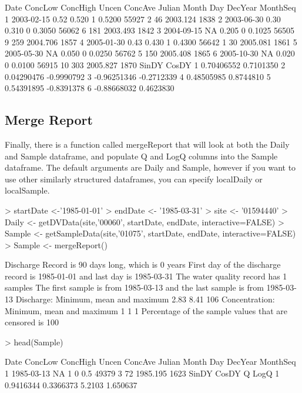 \documentclass[a4paper,11pt]{article}
\begin{document}
\begin{Schunk}
\begin{Soutput}
        Date ConcLow ConcHigh Uncen ConcAve Julian Month Day  DecYear MonthSeq
1 2003-02-15    0.52    0.520     1  0.5200  55927     2  46 2003.124     1838
2 2003-06-30    0.30    0.310     0  0.3050  56062     6 181 2003.493     1842
3 2004-09-15      NA    0.205     0  0.1025  56505     9 259 2004.706     1857
4 2005-01-30    0.43    0.430     1  0.4300  56642     1  30 2005.081     1861
5 2005-05-30      NA    0.050     0  0.0250  56762     5 150 2005.408     1865
6 2005-10-30      NA    0.020     0  0.0100  56915    10 303 2005.827     1870
        SinDY      CosDY
1  0.70406552  0.7101350
2  0.04290476 -0.9990792
3 -0.96251346 -0.2712339
4  0.48505985  0.8744810
5  0.54391895 -0.8391378
6 -0.88668032  0.4623830
\end{Soutput}
\end{Schunk}

\subsection{Merge Report}
Finally, there is a function called mergeReport that will look at both the Daily and Sample dataframe, and populate Q and LogQ columns into the Sample dataframe. The default arguments are Daily and Sample, however if you want to use other similarly structured dataframes, you can specify localDaily or localSample.

\begin{Schunk}
\begin{Sinput}
> startDate <-'1985-01-01' 
> endDate <- '1985-03-31'
> site <- '01594440'
> Daily <- getDVData(site,'00060', startDate, endDate, interactive=FALSE)
> Sample <- getSampleData(site,'01075', startDate, endDate, interactive=FALSE)
> Sample <- mergeReport()
\end{Sinput}
\begin{Soutput}
 Discharge Record is 90 days long, which is 0 years
 First day of the discharge record is 1985-01-01 and last day is 1985-03-31
 The water quality record has 1 samples
 The first sample is from 1985-03-13 and the last sample is from 1985-03-13
 Discharge: Minimum, mean and maximum 2.83 8.41 106
 Concentration: Minimum, mean and maximum 1 1 1
 Percentage of the sample values that are censored is 100 %
\end{Soutput}
\begin{Sinput}
> head(Sample)
\end{Sinput}
\begin{Soutput}
        Date ConcLow ConcHigh Uncen ConcAve Julian Month Day  DecYear MonthSeq
1 1985-03-13      NA        1     0     0.5  49379     3  72 1985.195     1623
      SinDY     CosDY      Q     LogQ
1 0.9416344 0.3366373 5.2103 1.650637
\end{Soutput}
\end{Schunk}
\end{document}
